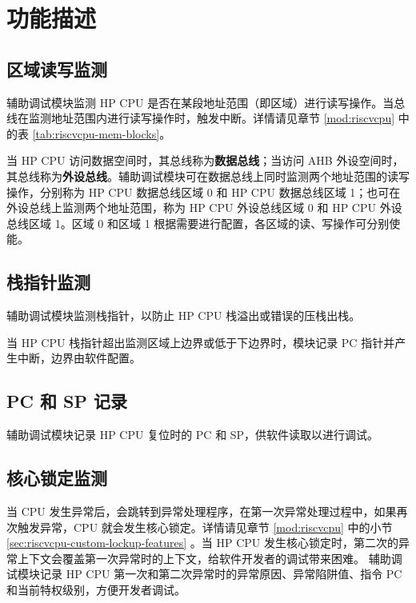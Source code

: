 \documentclass[main\_\_CN.tex]{subfiles}
\begin{document}
\section{功能描述}
\label{sec:dbgassist-func-descr}

\subsection{区域读写监测}

辅助调试模块监测 HP CPU 是否在某段地址范围（即区域）进行读写操作。当总线在监测地址范围内进行读写操作时，触发中断。详情请见章节 \ref{mod:riscvcpu} \textit{} 中的表 \ref{tab:riscvcpu-mem-blocks}。

当 HP CPU 访问数据空间时，其总线称为\textbf{数据总线}；当访问 AHB 外设空间时，其总线称为\textbf{外设总线}。辅助调试模块可在数据总线上同时监测两个地址范围的读写操作，分别称为 HP CPU 数据总线区域 0 和 HP CPU 数据总线区域 1；也可在外设总线上监测两个地址范围，称为 HP CPU 外设总线区域 0 和 HP CPU 外设总线区域 1。区域 0 和区域 1 根据需要进行配置，各区域的读、写操作可分别使能。

\subsection{栈指针监测}

辅助调试模块监测栈指针，以防止 HP CPU 栈溢出或错误的压栈出栈。

当 HP CPU 栈指针超出监测区域上边界或低于下边界时，模块记录 PC 指针并产生中断，边界由软件配置。

\subsection{PC 和 SP 记录}

辅助调试模块记录 HP CPU 复位时的 PC 和 SP，供软件读取以进行调试。


\subsection{核心锁定监测}

当 CPU 发生异常后，会跳转到异常处理程序，在第一次异常处理过程中，如果再次触发异常，CPU 就会发生核心锁定。详情请见章节 \ref{mod:riscvcpu} \textit{} 中的小节 \ref{sec:riscvcpu-custom-lockup-features} \textit{}。当 HP CPU 发生核心锁定时，第二次的异常上下文会覆盖第一次异常时的上下文，给软件开发者的调试带来困难。
辅助调试模块记录 HP CPU 第一次和第二次异常时的异常原因、异常陷阱值、指令 PC 和当前特权级别，方便开发者调试。
\end{document}
